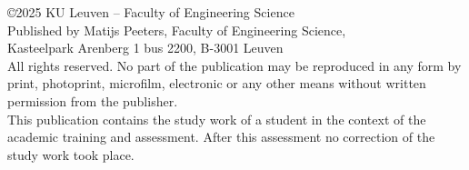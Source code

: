 \documentclass[a4paper,12pt]{report}
\begin{document}
\setcounter{page}{1}
\thispagestyle{empty}



\newpage
\thispagestyle{empty}
\vspace*{\fill}
\begin{center}
  \begin{minipage}{0.8\textwidth}
    \centering
    \justifying
    \noindent \copyright  2025 KU Leuven – Faculty of Engineering Science\\
    Published by Matijs Peeters, Faculty of Engineering Science,\\ Kasteelpark Arenberg 1 bus 2200, B-3001 Leuven\\
    All rights reserved. No part of the publication may be reproduced in any form by print, photoprint, microfilm, electronic or any other means without written permission from the publisher.\\
    This publication contains the study work of a student in the context of the academic training and assessment. After this assessment no correction of the study work took place.
  \end{minipage}
\end{center}
\vspace*{0pt}
\newpage

\tableofcontents


\newpage
\listoffigures
\listoftables
\newpage


%








\end{document}
